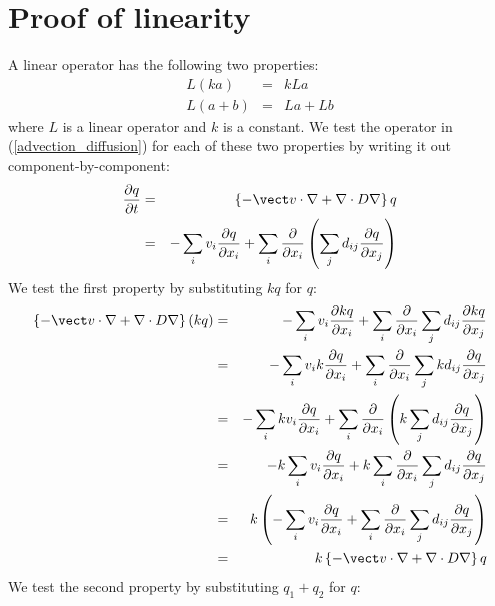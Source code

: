 
\section{Proof of linearity}

\label{linearity}


A linear operator has the following two properties:
\begin{eqnarray}
	L(ka) & = & kLa \\
	L(a+b) & = & La + Lb
\end{eqnarray}
where $L$ is a linear operator and $k$ is a constant.
We test the operator in (\ref{advection_diffusion}) for each of these two
properties by writing it out component-by-component:
\begin{eqnarray}
	\frac{\partial q}{\partial t} & = & \left \lbrace -\vect v \cdot \nabla + \nabla \cdot D \nabla \right \rbrace q \\
				   & = & - \sum_i v_i \frac{\partial q}{\partial x_i} + \sum_i \frac{\partial}{\partial x_i} \left ( \sum_j d_{ij} \frac{\partial q}{\partial x_j} \right )
\end{eqnarray}
We test the first property by substituting $kq$ for $q$:
\begin{eqnarray}
	\left \lbrace -\vect v \cdot \nabla + \nabla \cdot D \nabla \right \rbrace (kq) & = & - \sum_i v_i \frac{\partial kq}{\partial x_i} + \sum_i \frac{\partial}{\partial x_i} \sum_j d_{ij} \frac{\partial kq}{\partial x_j} \\
	& = & - \sum_i v_i k \frac{\partial q}{\partial x_i} + \sum_i \frac{\partial}{\partial x_i} \sum_j k d_{ij} \frac{\partial q}{\partial x_j} \\
	& = & - \sum_i k v_i \frac{\partial q}{\partial x_i} + \sum_i \frac{\partial}{\partial x_i} \left ( k \sum_j d_{ij} \frac{\partial q}{\partial x_j} \right ) \\
	& = & - k \sum_i v_i \frac{\partial q}{\partial x_i} + k \sum_i \frac{\partial}{\partial x_i} \sum_j d_{ij} \frac{\partial q}{\partial x_j} \\
	& = & k \left ( - \sum_i v_i \frac{\partial q}{\partial x_i} + \sum_i \frac{\partial}{\partial x_i} \sum_j d_{ij} \frac{\partial q}{\partial x_j} \right ) \\
	& = & k \left \lbrace -\vect v \cdot \nabla + \nabla \cdot D \nabla \right \rbrace q
\end{eqnarray}
We test the second property by substituting $q_1 + q_2$ for $q$:
